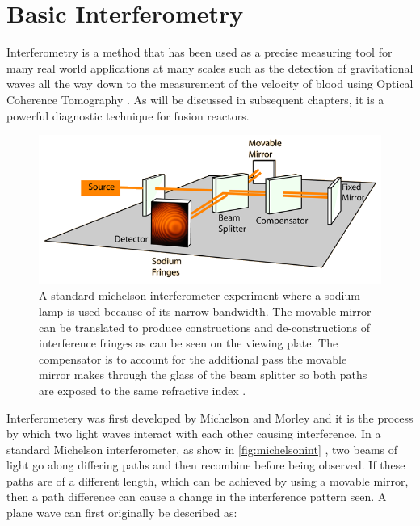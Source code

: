 \documentclass[12pt,a4paper,oneside]{report}
\begin{document}
	\section{Basic Interferometry}
Interferometry is a method that has been used as a precise measuring tool for many real world applications at many scales such as the detection of gravitational waves \cite{AbbottObservationMerger} all the way down to the measurement of the velocity of blood using Optical Coherence Tomography \cite{Zhao2000Phase-resolvedSensitivity}. As will be discussed in subsequent chapters, it is a powerful diagnostic technique for fusion reactors.
\begin{figure}[H]
\includegraphics[width=1\textwidth, center,angle=0]{Images/michelsonint.png}
\caption{A standard michelson interferometer experiment where a sodium lamp is used because of its narrow bandwidth. The movable mirror can be translated to produce constructions and de-constructions of interference fringes as can be seen on the viewing plate. The compensator is to account for the additional pass the movable mirror makes through the glass of the beam splitter so both paths are exposed to the same refractive index \cite{Michelsonimage}.}
\label{fig:michelsonint}
\end{figure}

Interferometery was first developed by Michelson and Morley \cite{Michelson1887RelativeEther} and it is the process by which two light waves interact with each other causing interference. In a standard Michelson interferometer, as show in \autoref{fig:michelsonint} , two beams of light go along differing paths and then recombine before being observed. If these paths are of a different length, which can be achieved by using a movable mirror, then a path difference can cause a change in the interference pattern seen. A plane wave can first originally be described as: 
\end{document}
